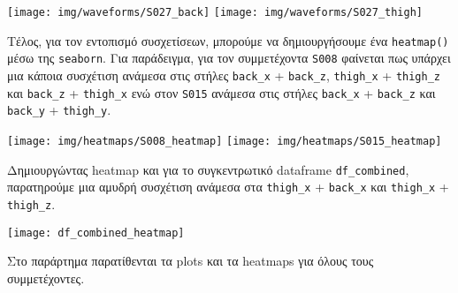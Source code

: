         \begin{multicols}{2} \centering
            \noindent\texttt{[image: img/waveforms/S027\_back]}
            \texttt{[image: img/waveforms/S027\_thigh]}
        \end{multicols}

        Τέλος, για τον εντοπισμό συσχετίσεων, μπορούμε να δημιουργήσουμε ένα \texttt{heatmap()} μέσω της \texttt{seaborn}.
        Για παράδειγμα, για τον συμμετέχοντα \texttt{S008} φαίνεται πως υπάρχει μια κάποια συσχέτιση ανάμεσα στις στήλες \verb|back_x| + \verb|back_z|,
        \verb|thigh_x| + \verb|thigh_z| και \verb|back_z| + \verb|thigh_x| ενώ στον \texttt{S015} ανάμεσα στις στήλες \verb|back_x| + \verb|back_z| και \verb|back_y| + \verb|thigh_y|.

        \pagebreak
        \begin{multicols}{2} \centering
            \noindent\texttt{[image: img/heatmaps/S008\_heatmap]}
            \texttt{[image: img/heatmaps/S015\_heatmap]}
        \end{multicols}

        Δημιουργώντας heatmap και για το συγκεντρωτικό dataframe \verb|df_combined|, παρατηρούμε μια  αμυδρή συσχέτιση
        ανάμεσα στα \verb|thigh_x| + \verb|back_x| και \verb|thigh_x| + \verb|thigh_z|.

        \vspace{-5pt}
        \begin{center}
            \texttt{[image: df\_combined\_heatmap]}
        \end{center}

        \begin{graycomment} \centering
            Στο παράρτημα παρατίθενται τα plots και τα heatmaps για όλους τους συμμετέχοντες.
        \end{graycomment}

        \vspace{20pt}